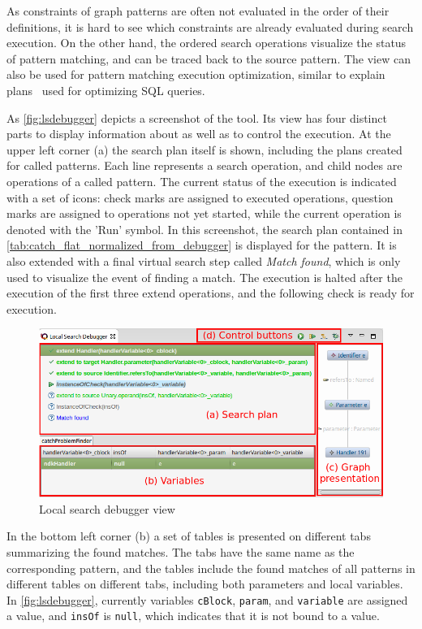 As constraints of graph patterns are often not evaluated in the order of their definitions, it is hard to see which constraints are already evaluated during search execution. On the other hand, the ordered search operations visualize the status of pattern matching, and can be traced back to the source pattern. The view can also be used for pattern matching execution optimization, similar to explain plans~\cite{oracle-enterprisemanager} used for optimizing SQL queries.

As \autoref{fig:lsdebugger} depicts a screenshot of the tool. Its view has four distinct parts to display information about as well as to control the execution. At the upper left corner (a) the search plan itself is shown, including the plans created for called patterns. Each line represents a search operation, and child nodes are operations of a called pattern. The current status of the execution is indicated with a set of icons: check marks are assigned to executed operations, question marks are assigned to operations not yet started, while the current operation is denoted with the 'Run' symbol. In this screenshot, the search plan contained in \autoref{tab:catch_flat_normalized_from_debugger} is displayed for the \catchproblem pattern. It is also extended with a final virtual search step called \emph{Match found}, which is only used to visualize the event of finding a match. The execution is halted after the execution of the first three extend operations, and the following check is ready for execution.


\begin{figure}[!htpb]
	\centering
	\includegraphics[width=\textwidth]{figures/ls-debugger-tooling}
	\caption{Local search debugger view}
	\label{fig:lsdebugger}
\end{figure}

In the bottom left corner (b) a set of tables is presented on different tabs summarizing the found matches. The tabs have the same name as the corresponding pattern, and the tables include the found matches of all patterns in different tables on different tabs, including both parameters and local variables. In \autoref{fig:lsdebugger}, currently variables \texttt{cBlock}, \texttt{param}, and \texttt{variable} are assigned a value, and \texttt{insOf} is \texttt{null}, which indicates that it is not bound to a value.

